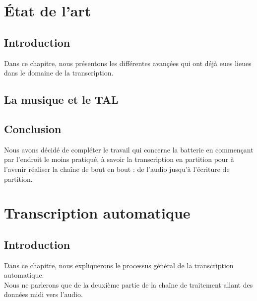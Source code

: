 \documentclass[a4paper,11pt,twoside]{memoir}
\begin{document}
\chapter{\'Etat de l'art}
\label{chap:articles}

\adjustmtc
\minitoc


\section{Introduction}
Dans ce chapitre, nous présentons les différentes avançées qui ont déjà eues lieues dans le domaine de la transcription.

\section{La musique et le TAL}



\section{Conclusion}
Nous avons décidé de compléter le travail qui concerne la batterie en commençant par l’endroit le moins pratiqué, à savoir la transcription en partition pour à l’avenir réaliser la chaîne de bout en bout : de l’audio jusqu’à l’écriture de partition.


\chapter{Transcription automatique}
\label{chap:transcription automatique}
\minitoc

\section{Introduction}
Dans ce chapitre, nous expliquerons le processus général de la transcription automatique.\\
Nous ne parlerons que de la deuxième partie de la chaîne de traitement allant des données midi vers l’audio.
\end{document}
